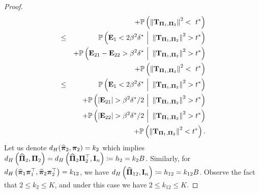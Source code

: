 \documentclass[numsec,webpdf,modern,medium,namedate]{oup-authoring-template}
\theoremstyle{thmstyleone}%
\theoremstyle{thmstyletwo}%
\theoremstyle{thmstylethree}%
\begin{document}
\begin{proof}
{\begin{eqnarray*}
        && + \Prob\left(\left\|\bT_{\bPi_1, \bPi_2} \right\|^2 <
        \ t^\ast\right)\\
        & \leq & \Prob\left(\bE_1 < 2\beta^2\delta^\ast\ {\Big|} \ \left\|\bT_{\bPi_1, \bPi_2} \right\|^2 > t^\ast\right)\\
        && + \Prob\left(\bE_{21} - \bE_{22} > \beta^2\delta^\ast \ {\Big|} \ \left\|\bT_{\bPi_1, \bPi_2} \right\|^2 > t^\ast\right)\\
        && + \Prob\left(\left\|\bT_{\bPi_1, \bPi_2} \right\|^2 <
        \ t^\ast\right) \\
        & \leq & \Prob\left(\bE_1 < 2\beta^2\delta^\ast\ {\Big|} \ \left\|\bT_{\bPi_1, \bPi_2} \right\|^2 > t^\ast\right)\\
        && + \Prob\left(|\bE_{21}| > {\beta^2\delta^\ast}/{2} \ {\Big|} \ \left\|\bT_{\bPi_1, \bPi_2} \right\|^2 > t^\ast\right)\\
        && + \Prob\left(|\bE_{22}| > {\beta^2\delta^\ast}/{2} \ {\Big|} \ \left\|\bT_{\bPi_1, \bPi_2} \right\|^2 > t^\ast\right)\\
        && + \Prob\left(\left\|\bT_{\bPi_1, \bPi_2} \right\|^2 <
        t^\ast\right).
    \end{eqnarray*}}
    Let us denote $d_H(\widehat{\boldsymbol{\pi}}_2,\boldsymbol{\pi}_2) = k_2$ which implies $d_H\left(\widehat{\boldsymbol{\Pi}}_2,\boldsymbol{\Pi}_2\right)=d_H\left(\widehat{\boldsymbol{\Pi}}_2\boldsymbol{\Pi}_2^\top,\mathbf{I}_n\right) \coloneqq h_2 = k_2B$.
    Similarly, for $d_H\left(\widehat{\boldsymbol{\pi}}_1 \boldsymbol{\pi}_1^\top ,  \widehat{\boldsymbol{\pi}}_2 \boldsymbol{\pi}_2^\top\right) = k_{12}$, we have $d_H\left(\widehat{\boldsymbol{\Pi}}_{12},\mathbf{I}_n\right) \coloneq h_{12}= k_{12}B$. Observe the fact that $2 \leq k_2 \leq K$, and under this case we have $2 \leq k_{12}\leq K$.
    

\end{proof}
\end{document}
